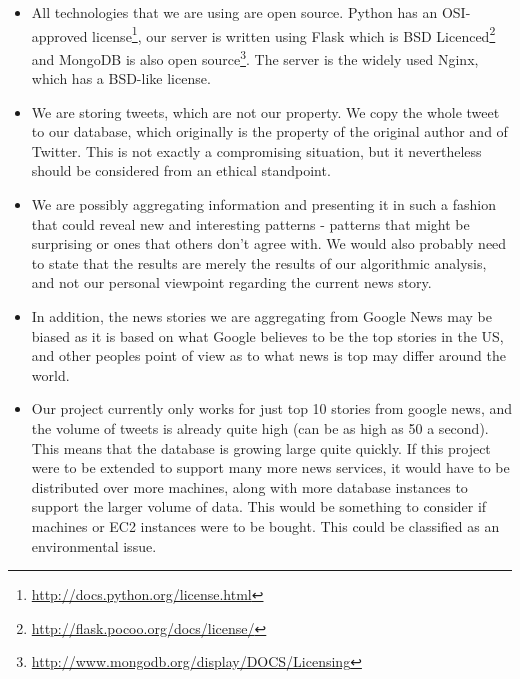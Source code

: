 \documentclass[a4paper,12pt]{article}
\begin{document}
	\begin{itemize}
	  
	  \item All technologies that we are using are open source. Python has an OSI-approved license\footnote{\url {http://docs.python.org/license.html}}, our server is written using Flask which is BSD Licenced\footnote{\url{http://flask.pocoo.org/docs/license/}} and MongoDB is also open source\footnote{\url{http://www.mongodb.org/display/DOCS/Licensing}}. The server is the widely used Nginx, which has a BSD-like license.
	  
		\item We are storing tweets, which are not our property. We copy the whole tweet to our database, which originally is the property of the original author and of Twitter. This is not exactly a compromising situation, but it nevertheless should be considered from an ethical standpoint.
		
		\item We are possibly aggregating information and presenting it in such a fashion that could reveal new and interesting patterns - patterns that might be surprising or ones that others don't agree with. We would also probably need to state that the results are merely the results of our algorithmic analysis, and not our personal viewpoint regarding the current news story.
		
		\item In addition, the news stories we are aggregating from Google News may be biased as it is based on what Google believes to be the top stories in the US, and other peoples point of view as to what news is top may differ around the world.
		
		\item Our project currently only works for just top 10 stories from google news, and the volume of tweets is already quite high (can be as high as 50 a second). This means that the database is growing large quite quickly. If this project were to be extended to support many more news services, it would have to be distributed over more machines, along with more database instances to support the larger volume of data. This would be something to consider if machines or EC2 instances were to be bought. This could be classified as an environmental issue.
	  
	  
  \end{itemize}
  
\end{document}
